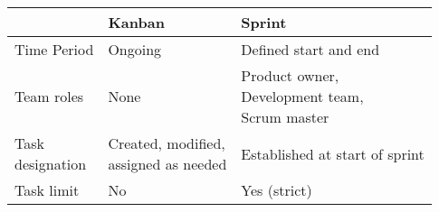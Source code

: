 \begin{tabular}{lll}
  & Kanban & Sprint \\ \hline
  
  Time Period & Ongoing & Defined start and end \\
  
  Team roles & None & \makecell[l]{Product owner,\\Development team,\\Scrum master} \\
  
  \makecell[l]{Task\\designation} & \makecell[l]{Created, modified,\\assigned as needed} & Established at start of sprint  \\
  
  Task limit & No & Yes (strict)
  
\end{tabular}